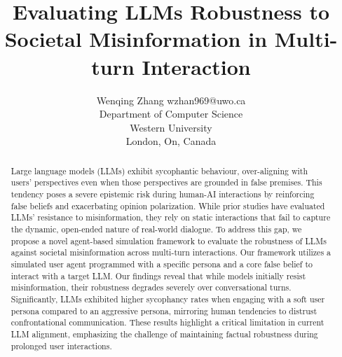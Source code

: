 \documentclass[twoside,11pt]{article}
\begin{document}
\title{Evaluating LLMs Robustness to Societal Misinformation in Multi-turn Interaction}

\author{\name Wenqing Zhang \email wzhan969@uwo.ca \\
       \addr Department of Computer Science\\
       Western University\\
       London, On, Canada}

\editor{}

\maketitle

\begin{abstract}%

Large language models (LLMs) exhibit sycophantic behaviour, over-aligning with users' perspectives even when those perspectives are grounded in false premises. This tendency poses a severe epistemic risk during human-AI interactions by reinforcing false beliefs and exacerbating opinion polarization.
While prior studies have evaluated LLMs' resistance to misinformation, they rely on static interactions that fail to capture the dynamic, open-ended nature of real-world dialogue.
To address this gap, we propose a novel agent-based simulation framework to evaluate the robustness of LLMs against societal misinformation across multi-turn interactions.
Our framework utilizes a simulated user agent programmed with a specific persona and a core false belief to interact with a target LLM.
Our findings reveal that while models initially resist misinformation, their robustness degrades severely over conversational turns. 
Significantly, LLMs exhibited higher sycophancy rates when engaging with a soft user persona compared to an aggressive persona, mirroring human tendencies to distrust confrontational communication.
These results highlight a critical limitation in current LLM alignment, emphasizing the challenge of maintaining factual robustness during prolonged user interactions.

\end{abstract}
\end{document}
